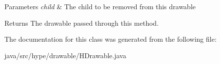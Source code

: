 \begin{DoxyParams}{Parameters}
{\em child} & The child to be removed from this drawable \\
\hline
\end{DoxyParams}
\begin{DoxyReturn}{Returns}
The drawable passed through this method. 
\end{DoxyReturn}


The documentation for this class was generated from the following file\-:\begin{DoxyCompactItemize}
\item 
java/src/hype/drawable/H\-Drawable.\-java\end{DoxyCompactItemize}
